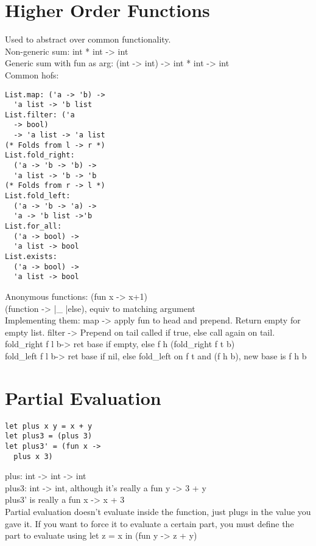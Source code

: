 \section{Higher Order Functions}
Used to abstract over common functionality.
\\Non-generic sum: int * int -> int
\\Generic sum with fun as arg: (int -> int) -> int * int -> int
\\ Common hofs:
\begin{lstlisting}
List.map: ('a -> 'b) ->
  'a list -> 'b list
List.filter: ('a
  -> bool)
  -> 'a list -> 'a list
(* Folds from l -> r *)
List.fold_right:
  ('a -> 'b -> 'b) ->
  'a list -> 'b -> 'b
(* Folds from r -> l *)
List.fold_left:
  ('a -> 'b -> 'a) ->
  'a -> 'b list ->'b
List.for_all:
  ('a -> bool) ->
  'a list -> bool
List.exists:
  ('a -> bool) ->
  'a list -> bool
\end{lstlisting}
Anonymous functions: (fun x -> x+1)
\\ (function -> |\_ |else), equiv to matching argument
\\ Implementing them: map -> apply fun to head and prepend. Return
empty for empty list. filter -> Prepend on tail called if true, else
call again on tail.
\\fold\_right f l b-> ret base if empty, else f h
(fold\_right f t b)
\\fold\_left f l b-> ret base if nil, else fold\_left on f t and (f h b), new
base is f h b
\color{Plum}
\section{Partial Evaluation}
\begin{lstlisting}
let plus x y = x + y
let plus3 = (plus 3)
let plus3' = (fun x ->
  plus x 3)
\end{lstlisting}
plus: int -> int -> int
\\plus3: int -> int, although it's really a fun y -> 3 + y
\\plus3' is really a fun x -> x + 3
\\ Partial evaluation doesn't evaluate inside the function, just plugs
in the value you gave it. If you want to force it to evaluate a
certain part, you must define the part to evaluate using let z = x in
(fun y -> z + y)
  